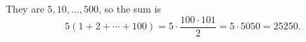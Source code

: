 They are $5,10,\dots,500$, so the sum is
\[
5(1+2+\cdots+100)=5\cdot\dfrac{100\cdot101}{2}=5\cdot5050=\boxed{25250}.
\]
